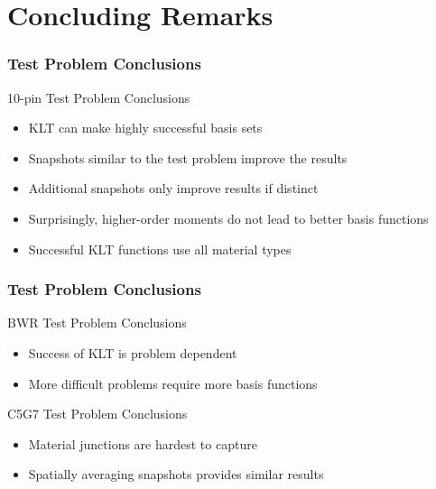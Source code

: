 \documentclass[fleqn]{beamer}
\begin{document}
  \section{Concluding Remarks}
  
  \begin{frame}
      \frametitle{Test Problem Conclusions}
      \begin{block}{10-pin Test Problem Conclusions}
          \begin{itemize}
              \item KLT can make highly successful basis sets
              \item Snapshots similar to the test problem improve the results
              \item Additional snapshots only improve results if distinct
              \item Surprisingly, higher-order moments do not lead to better 
              basis functions
              \item Successful KLT functions use all material types
          \end{itemize}
      \end{block}
  \end{frame}
  
  \begin{frame}
      \frametitle{Test Problem Conclusions}
      \begin{block}{BWR Test Problem Conclusions}
          \begin{itemize}
              \item Success of KLT is problem dependent
              \item More difficult problems require more basis functions
          \end{itemize}
      \end{block}
      \begin{block}{C5G7 Test Problem Conclusions}
          \begin{itemize}
              \item Material junctions are hardest to capture
              \item Spatially averaging snapshots provides similar results
          \end{itemize}
      \end{block}
  \end{frame}
  
\end{document}
